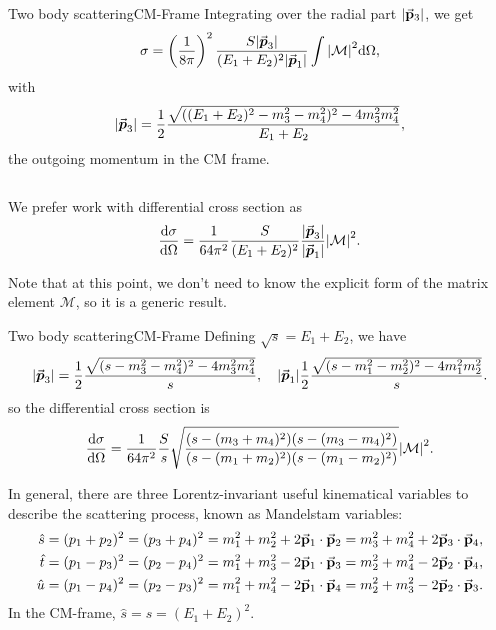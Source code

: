 \documentclass{../bredelebeamer}
\begin{document}
\begin{frame}{Two body scattering}{CM-Frame}
    Integrating over the radial part $\abs{\va p_3}$, we get
    \begin{equation}
        \sigma = \left(\frac{1}{8\pi}\right)^2 \frac{S |\va*{p}_3|}{(E_1 +E_2)^2 \abs{\va*{p}_1}} \int \abs{\mathcal{M}}^2 \dd\Omega,
    \end{equation}
    with
    \begin{equation}
        |\va*{p}_3| = \frac{1}{2} \frac{\sqrt{((E_1+E_2)^2 - m_3^2 -m_4^2)^2- 4m^2_3m^2_4} }{E_1+E_2},
    \end{equation}
    the outgoing momentum in the CM frame.

    $$ $$

    We prefer work with differential cross section as
    \begin{equation}
        \frac{\dd \sigma}{\dd \Omega} = \frac{1}{64\pi^2} \frac{S }{(E_1 +E_2)^2 } \frac{|\va*{p}_3|}{\abs{\va*{p}_1}} \abs{\mathcal{M}}^2.
    \end{equation}


    Note that at this point, we don't need to know the explicit form of the matrix element $\mathcal{M}$, so it is a generic result.
\end{frame}

\begin{frame}{Two body scattering}{CM-Frame}
    Defining $\sqrt s = E_1 + E_2$, we have
    \begin{equation}
        |\va*{p}_3| = \frac{1}{2} \frac{\sqrt{(s - m_3^2 -m_4^2)^2- 4m^2_3m^2_4} }{s}, \quad  |\va*{p}_1|\frac{1}{2} \frac{\sqrt{(s - m_1^2 -m_2^2)^2- 4m^2_1m^2_2} }{s}.
    \end{equation}
    so the differential cross section is
    \begin{equation}
        \frac{\dd \sigma}{\dd \Omega} = \frac{1}{64\pi^2} \frac{S }{s }
        \sqrt{\frac{(s - (m_3 + m_4)^2)(s - (m_3 - m_4)^2)}{(s - (m_1 + m_2)^2)(s - (m_1 - m_2)^2)}}
        \abs{\mathcal{M}}^2.
    \end{equation}

    In general, there are three Lorentz-invariant useful kinematical variables to describe the scattering process, known as Mandelstam variables:
    \begin{align}
        \hat s & = (p_1 + p_2)^2 = (p_3 + p_4)^2 = m_1^2 + m_2^2 + 2\va p_1\cdot \va p_2 = m_3^2 + m_4^2 + 2\va p_3\cdot \va p_4, \\
        \hat t & = (p_1 - p_3)^2 = (p_2 - p_4)^2= m_1^2 + m_3^2 - 2\va p_1\cdot \va p_3 = m_2^2 + m_4^2 - 2\va p_2\cdot \va p_4,  \\
        \hat u & = (p_1 - p_4)^2 = (p_2 - p_3)^2= m_1^2 + m_4^2 - 2\va p_1\cdot \va p_4 = m_2^2 + m_3^2 - 2\va p_2\cdot \va p_3.
    \end{align}
    In the CM-frame, $\hat s = s = (E_1+E_2)^2$.
\end{frame}
\end{document}
